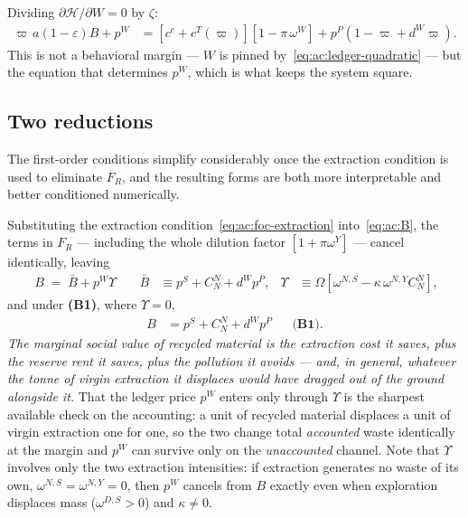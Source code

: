  Dividing $\partial\mathcal H/\partial W=0$ by $\zeta$:
\begin{align}
\varpi\,a\left(1-\varepsilon\right)B+p^W &= \left[c^c+c^T(\varpi)\right]\left[1-\pi\,\omega^W\right]+p^P\left(1-\varpi+d^W\varpi\right).
\label{eq:ac:foc-waste}
\end{align}
This is not a behavioral margin --- $W$ is pinned by~\eqref{eq:ac:ledger-quadratic} --- but the equation that determines $p^W$, which is what keeps the system square.

\subsection{Two reductions}
\label{subsec:ac:reductions}

The first-order conditions simplify considerably once the extraction condition is used to eliminate $F_R$, and the resulting forms are both more interpretable and better conditioned numerically.

 Substituting the extraction condition~\eqref{eq:ac:foc-extraction} into~\eqref{eq:ac:B}, the terms in $F_R$ --- including the whole dilution factor $\left[1+\pi\omega^Y\right]$ --- cancel identically, leaving
\begin{align}
\boxed{\;B \;=\; \bar B+p^W\Upsilon\;}
&&
\bar B &\equiv p^S+C^N_N+d^Wp^P,
&
\Upsilon &\equiv \Omega\left[\omega^{N,S}-\kappa\,\omega^{N,Y}C^N_N\right],
\label{eq:ac:B-reduced}
\end{align}
and under \textbf{(B1)}, where $\Upsilon=0$,
\begin{align}
B &= p^S+C^N_N+d^Wp^P
&&\textbf{(B1)}.
\label{eq:ac:B-reduced-B1}
\end{align}
\emph{The marginal social value of recycled material is the extraction cost it saves, plus the reserve rent it saves, plus the pollution it avoids --- and, in general, whatever the tonne of virgin extraction it displaces would have dragged out of the ground alongside it.} That the ledger price $p^W$ enters only through $\Upsilon$ is the sharpest available check on the accounting: a unit of recycled material displaces a unit of virgin extraction one for one, so the two change total \emph{accounted} waste identically at the margin and $p^W$ can survive only on the \emph{unaccounted} channel. Note that $\Upsilon$ involves only the two extraction intensities: if extraction generates no waste of its own, $\omega^{N,S}=\omega^{N,Y}=0$, then $p^W$ cancels from $B$ exactly even when exploration displaces mass ($\omega^{D,S}>0$) and $\kappa\neq0$.

